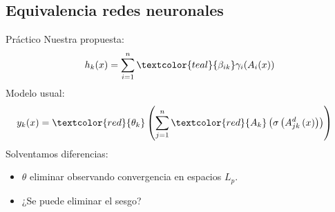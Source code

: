 \documentclass{beamer}
\begin{document}
\subsection{Equivalencia redes neuronales}
\begin{frame}{Práctico}
    Nuestra propuesta: 
    \begin{align*}
                h_k(x) = 
                \sum_{i=1}^{n} \textcolor{teal}{\beta_{i k}} \gamma_{i}( A_{i}(x))
    \end{align*}
    Modelo usual:
    \begin{align*}
        y_k(x) &= 
        \textcolor{red}{\theta_k}
        \left( 
            \sum^n_{j=1} \textcolor{red}{A_{k}}
            \left(
                \sigma 
                \left(
                    A^{d}_{j k}
                    \left(
                        x
                    \right)
                \right)
            \right)
        \right)
    \end{align*}
    Solventamos diferencias: 
    \begin{itemize}
        \item $\theta$ eliminar observando convergencia en espacios $L_p$.
        \item ¿Se puede eliminar el sesgo?
    \end{itemize}
\end{frame}

\end{document}
